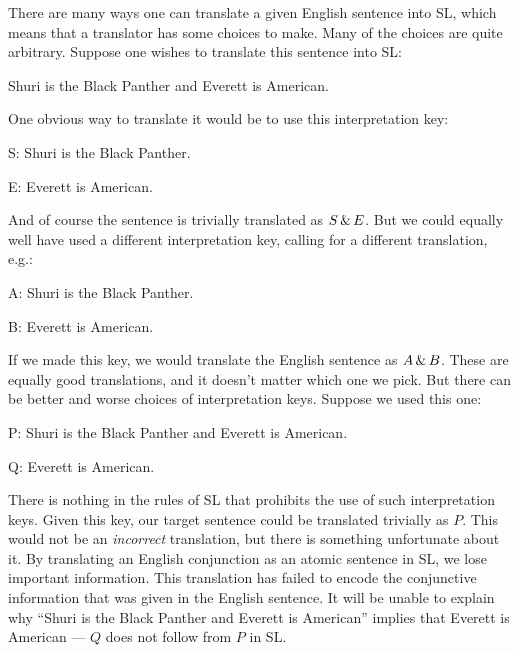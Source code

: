 There are many ways one can translate a given English sentence into SL, which means that a translator has some choices to make. Many of the choices are quite arbitrary. Suppose one wishes to translate this sentence into SL:

\begin{earg}
\item[] Shuri is the Black Panther and Everett is American.
\end{earg}

One obvious way to translate it would be to use this interpretation key:

\begin{ekey}
\item[S:] Shuri is the Black Panther.
\item[E:] Everett is American.
\end{ekey}

And of course the sentence is trivially translated as $S \,\&\, E$. But we could equally well have used a different interpretation key, calling for a different translation, e.g.:

\begin{ekey}
\item[A:] Shuri is the Black Panther.
\item[B:] Everett is American.
\end{ekey}

If we made this key, we would translate the English sentence as $A \,\&\, B$. These are equally good translations, and it doesn't matter which one we pick. But there can be better and worse choices of interpretation keys. Suppose we used this one:

\begin{ekey}
\item[P:] Shuri is the Black Panther and Everett is American.
\item[Q:] Everett is American.
\end{ekey}

There is nothing in the rules of SL that prohibits the use of such interpretation keys. Given this key, our target sentence could be translated trivially as $P$. This would not be an \emph{incorrect} translation, but there is something unfortunate about it. By translating an English conjunction as an atomic sentence in SL, we lose important information. This translation has failed to encode the conjunctive information that was given in the English sentence. It will be unable to explain why ``Shuri is the Black Panther and Everett is American'' implies that Everett is American --- $Q$ does not follow from $P$ in SL.

